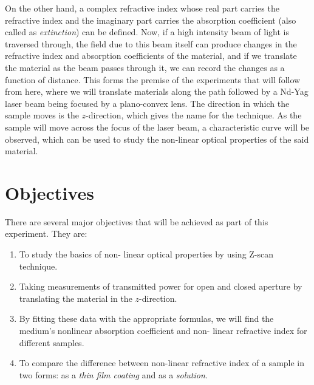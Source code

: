 \documentclass[%
 reprint,
 amsmath,amssymb,
 aps,
]{revtex4-2}
\begin{document}
	\par
	On the other hand, a complex refractive index whose real part carries the refractive index and the imaginary part carries the absorption coefficient (also called as \textit{extinction}) can be defined. Now, if a high intensity beam of light is traversed through, the field due to this beam itself can produce changes in the refractive index and absorption coefficients of the material, and if we translate the material as the beam passes through it, we can record the changes as a function of distance. This forms the premise of the experiments that will follow from here, where we will translate materials along the path followed by a Nd-Yag laser beam being focused by a plano-convex lens. The direction in which the sample moves is the $ z $-direction, which gives the name for the technique. As the sample will move across the focus of the laser beam, a characteristic curve will be observed, which can be used to study the non-linear optical properties of the said material.
	



\section{Objectives}
	There are several major objectives that will be achieved as part of this experiment. They are:
	\begin{enumerate}
		\item To study the basics of non-
		linear optical properties by
		using Z-scan technique.
		\item Taking measurements of transmitted power for open and
		closed aperture by translating
		the material in the $ z $-direction.
		\item By fitting these data with the
		appropriate formulas, we will
		find the medium's nonlinear
		absorption coefficient and non-
		linear refractive index for different samples.
		\item To compare the difference between non-linear refractive index of a sample in two forms: as a \textit{thin film coating} and as a \textit{solution}. 
	\end{enumerate}


	
	
\end{document}
